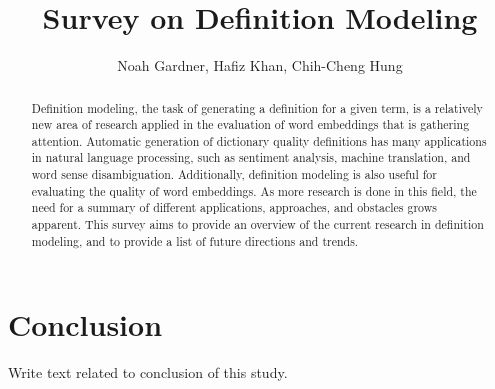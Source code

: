 \documentclass{aci}
\numberwithin{equation}{section}
\begin{document}
\title{Survey on Definition Modeling}

\author{%
    Noah Gardner,
    Hafiz Khan,
    Chih-Cheng Hung\corrauth
}%


\address{%
    }

\begin{abstract}
    Definition modeling, the task of generating a definition for a given term,
    is a relatively new area of research applied in the evaluation of word
    embeddings that is gathering attention. Automatic generation of dictionary
    quality definitions has many applications in natural language processing,
    such as sentiment analysis, machine translation, and word sense
    disambiguation. Additionally, definition modeling is also useful for
    evaluating the quality of word embeddings. As more research is done in this
    field, the need for a summary of different applications, approaches, and
    obstacles grows apparent. This survey aims to provide an overview of the
    current research in definition modeling, and to provide a list of future
    directions and trends.
\end{abstract}
\maketitle








\FloatBarrier
\section{Conclusion}
Write text related to conclusion of this study.

\printbibliography
\end{document}
